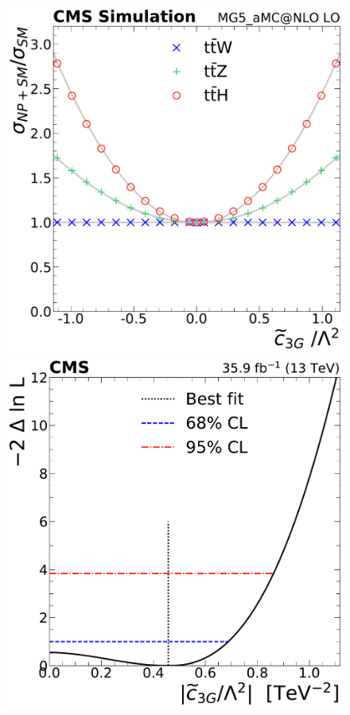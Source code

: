 \begin{landscape}
\begin{figure}
{        \includegraphics[height=\textheight]{figures/thirteen-TeV/NP/mu/tc3G}\hspace{1cm}
        \includegraphics[height=\textheight]{figures/thirteen-TeV/NP/nll/tc3G}\hspace{1cm}
}
\end{figure}
\end{landscape}
